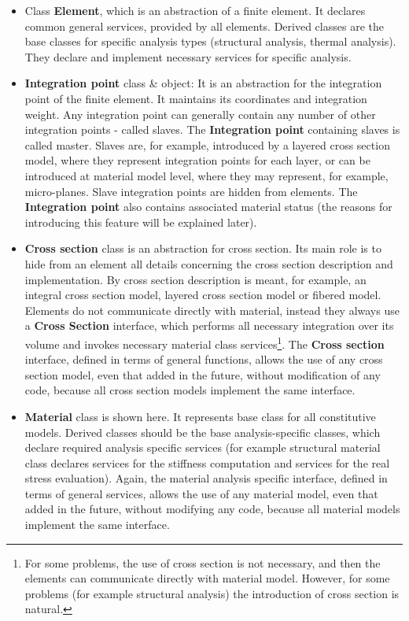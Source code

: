 \documentclass[12pt,draft]{article}
\newcommand{\class}[1]{{\bf #1}}
\begin{document}
\begin{itemize}
\item
Class \class{Element}, which is an abstraction of a finite element. It declares
common general services, provided by all elements. Derived
classes are the base classes for specific analysis types (structural
analysis, thermal analysis).  They declare and implement necessary services for
specific analysis.

\item
\class{Integration point} class \& object: It is an abstraction for
the integration
point of the finite element. It maintains its coordinates and integration
weight. Any integration point can generally contain any number of
other integration points - called slaves. The \class{Integration
point} containing slaves is called master. Slaves are, for example,
introduced by a layered cross section model, where they represent
integration points for each layer, or can be introduced at material
model level, where they may represent, for example, micro-planes. Slave
integration points are hidden from elements. The \class{Integration point}
also contains associated material status (the reasons for introducing
this feature will be explained later).

\item
\class{Cross section} class is an abstraction for cross section. Its
main role is to hide from an element all details concerning the cross
section description and implementation. By cross section description
is meant, for example, an integral cross section model, layered cross
section model or fibered model. Elements do not communicate directly
with material, instead they always use a \class{Cross Section} interface, which
performs all necessary integration over its volume and invokes
necessary material class services\footnote{For some problems, the use
of cross section is not necessary, and then
the elements can communicate directly with material model. However, for
 some problems (for example structural analysis) the introduction of cross section 
is natural.}. The \class{Cross section} interface, defined in
terms of general functions, allows the use of any cross section
model, even that added in the future, without modification of any code,
because all cross section models implement the same interface.


\item
\class{Material} class is shown here. It represents base class for all
constitutive models. Derived classes should be the base
analysis-specific classes, which declare required analysis
specific services (for example structural material class declares
services for the stiffness computation and services for the real stress
evaluation). Again, the material analysis specific interface, defined
in terms of general services, allows the use of any material model, even
that added in the future, without modifying any code, because all material
models implement the same interface.
\end{itemize}
\end{document}
